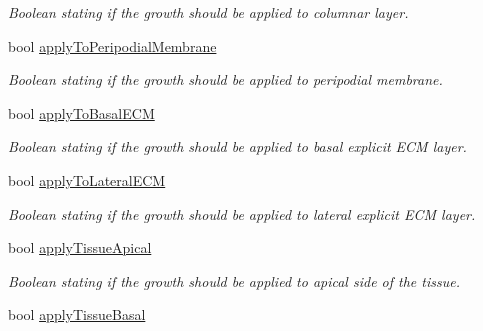 \begin{DoxyCompactItemize}
\begin{DoxyCompactList}\small\item\em Boolean stating if the growth should be applied to columnar layer. \end{DoxyCompactList}\item 
\hypertarget{classGrowthFunctionBase_a08ae19f58cb98fa8e315a77f52749732}{}bool \hyperlink{classGrowthFunctionBase_a08ae19f58cb98fa8e315a77f52749732}{apply\+To\+Peripodial\+Membrane}\label{classGrowthFunctionBase_a08ae19f58cb98fa8e315a77f52749732}

\begin{DoxyCompactList}\small\item\em Boolean stating if the growth should be applied to peripodial membrane. \end{DoxyCompactList}\item 
\hypertarget{classGrowthFunctionBase_a9fe46fc6dde4041b79204beb48972a09}{}bool \hyperlink{classGrowthFunctionBase_a9fe46fc6dde4041b79204beb48972a09}{apply\+To\+Basal\+E\+C\+M}\label{classGrowthFunctionBase_a9fe46fc6dde4041b79204beb48972a09}

\begin{DoxyCompactList}\small\item\em Boolean stating if the growth should be applied to basal explicit E\+C\+M layer. \end{DoxyCompactList}\item 
\hypertarget{classGrowthFunctionBase_ac623b1dbe376bce5dddbe1a2e21c776f}{}bool \hyperlink{classGrowthFunctionBase_ac623b1dbe376bce5dddbe1a2e21c776f}{apply\+To\+Lateral\+E\+C\+M}\label{classGrowthFunctionBase_ac623b1dbe376bce5dddbe1a2e21c776f}

\begin{DoxyCompactList}\small\item\em Boolean stating if the growth should be applied to lateral explicit E\+C\+M layer. \end{DoxyCompactList}\item 
\hypertarget{classGrowthFunctionBase_a254c82be25d3648a0474c24a63d5a555}{}bool \hyperlink{classGrowthFunctionBase_a254c82be25d3648a0474c24a63d5a555}{apply\+Tissue\+Apical}\label{classGrowthFunctionBase_a254c82be25d3648a0474c24a63d5a555}

\begin{DoxyCompactList}\small\item\em Boolean stating if the growth should be applied to apical side of the tissue. \end{DoxyCompactList}\item 
\hypertarget{classGrowthFunctionBase_afcbfd4691a386ba9dbf75888e0a4ef9e}{}bool \hyperlink{classGrowthFunctionBase_afcbfd4691a386ba9dbf75888e0a4ef9e}{apply\+Tissue\+Basal}\label{classGrowthFunctionBase_afcbfd4691a386ba9dbf75888e0a4ef9e}


\end{DoxyCompactItemize}
